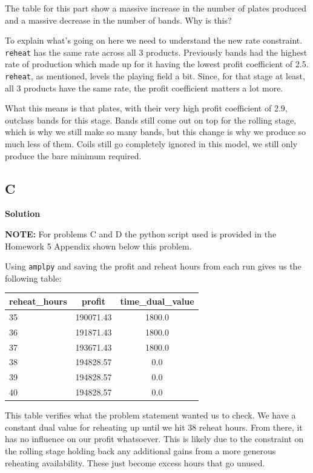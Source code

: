 The table for this part show a massive increase in the number of plates produced and a massive decrease in the number of bands. Why is this? 

To explain what's going on here we need to understand the new rate constraint. \texttt{reheat} has the same rate across all 3 products. Previously bands had the highest rate of production which made up for it having the lowest profit coefficient of 2.5. \texttt{reheat}, as mentioned, levels the playing field a bit. Since, for that stage at least, all 3 products have the same rate, the profit coefficient matters a lot more. 

What this means is that plates, with their very high profit coefficient of 2.9, outclass bands for this stage. Bands still come out on top for the rolling stage, which is why we still make so many bands, but this change is why we produce so much less of them. Coils still go completely ignored in this model, we still only produce the bare minimum required. 

\subsection*{C}

\noindent\textbf{Solution}

\textbf{NOTE:} For problems C and D the python script used is provided in the Homework 5 Appendix shown below this problem.

Using \texttt{amplpy} and saving the profit and reheat hours from each run gives us the following table:

\begin{table}[!ht]
    \centering
    \begin{tabular}{lcc}
    \hline
        reheat\_hours & profit & time\_dual\_value \\ \hline
        35 & 190071.43 & 1800.0 \\
        36 & 191871.43 & 1800.0 \\
        37 & 193671.43 & 1800.0 \\
        38 & 194828.57 & 0.0 \\
        39 & 194828.57 & 0.0 \\
        40 & 194828.57 & 0.0 \\
    \hline
    \end{tabular}
\end{table}


This table verifies what the problem statement wanted us to check. We have a constant dual value for reheating up until we hit 38 reheat hours. From there, it has no influence on our profit whatsoever. This is likely due to the constraint on the rolling stage holding back any additional gains from a more generous reheating availability. These just become excess hours that go unused.  

